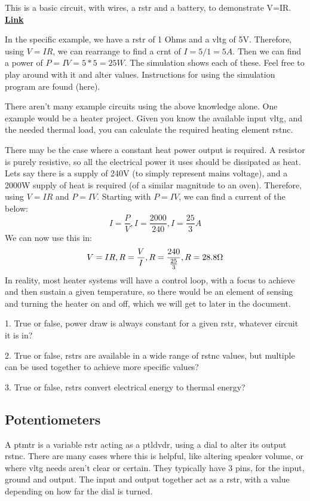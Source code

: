 \documentclass[a4paper,11pt]{report}
\newcommand{\Examples}[1] %
{
\par\noindent %
\phantomsection %
\todo[inline, color=red!30]{\textbf{#1}} %
\vspace{1em} %
}
\newcommand{\Quiz}[1] %
{
\par\noindent %
\phantomsection %
\todo[inline, color=blue!30]{\textbf{#1}} %
\vspace{1em} %
}
\let\oldhref\href %
\renewcommand{\href}[2]{\oldhref{#1}{\bfseries#2}}
\begin{document}
\Examples{Example circuits etc}

This is a basic circuit, with wires, a \gls{rstr} and a battery, to demonstrate V=IR. \href{https://tinyurl.com/27gj49kj}{Link}

In the specific example, we have a \gls{rstr} of 1 Ohms and a \gls{vltg} of 5V. Therefore, using $V=IR$, we can rearrange to find a \gls{crnt} of $I = 5/1 = 5A$. Then we can find a power of $P = IV = 5*5 = 25W$. The simulation shows each of these. Feel free to play around with it and alter values. Instructions for using the simulation program are found (here).

There aren't many example circuits using the above knowledge alone. One example would be a heater project. Given you know the available input \gls{vltg}, and the needed thermal load, you can calculate the required heating element \gls{rstnc}.

There may be the case where a constant heat power output is required. A resistor is purely resistive, so all the electrical power it uses should be dissipated as heat. Lets say there is a supply of 240V (to simply represent mains voltage), and a 2000W supply of heat is required (of a similar magnitude to an oven). Therefore, using $V=IR$ and $P=IV$. Starting with $P=IV$, we can find a current of the below:
\[I=\frac{P}{V}, I=\frac{2000}{240}, I=\frac{25}{3}A\]
We can now use this in:
\[V=IR, R=\frac{V}{I}, R=\frac{240}{\frac{25}{3}}, R=28.8\ohm\]
In reality, most heater systems will have a control loop, with a focus to achieve and then sustain a given temperature, so there would be an element of sensing and turning the heater on and off, which we will get to later in the document.

\Quiz{Quiz}

1. True or false, power draw is always constant for a given \gls{rstr}, whatever circuit it is in?

2. True or false, \gls{rstr}s are available in a wide range of \gls{rstnc} values, but multiple can be used together to achieve more specific values?

3. True or false, \gls{rstr}s convert electrical energy to thermal energy?

\vspace*{1\baselineskip}

\subsection{Potentiometers}

A \gls{ptmtr} is a variable \gls{rstr} acting as a \gls{ptldvdr}, using a dial to alter its output \gls{rstnc}. There are many cases where this is helpful, like altering speaker volume, or where \gls{vltg} needs aren't clear or certain. They typically have 3 pins, for the input, ground and output. The input and output together act as a \gls{rstr}, with a value depending on how far the dial is turned.
\end{document}
